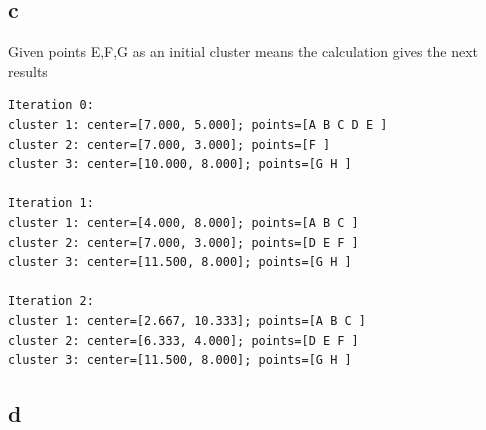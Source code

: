 \subsection{c}
Given points E,F,G as an initial cluster means the calculation gives the next results
\begin{verbatim}
Iteration 0:
cluster 1: center=[7.000, 5.000]; points=[A B C D E ]
cluster 2: center=[7.000, 3.000]; points=[F ]
cluster 3: center=[10.000, 8.000]; points=[G H ]

Iteration 1:
cluster 1: center=[4.000, 8.000]; points=[A B C ]
cluster 2: center=[7.000, 3.000]; points=[D E F ]
cluster 3: center=[11.500, 8.000]; points=[G H ]

Iteration 2:
cluster 1: center=[2.667, 10.333]; points=[A B C ]
cluster 2: center=[6.333, 4.000]; points=[D E F ]
cluster 3: center=[11.500, 8.000]; points=[G H ]
\end{verbatim}
\subsection{d}